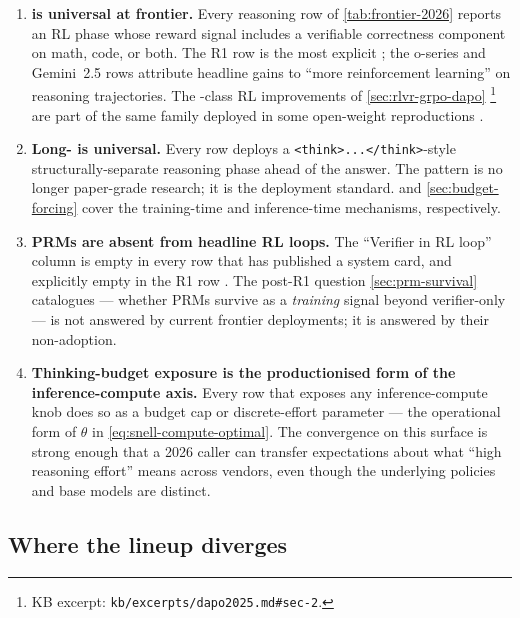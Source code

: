 \begin{enumerate}
\item \textbf{ is universal at frontier.} Every reasoning row of
\cref{tab:frontier-2026} reports an RL phase whose reward signal
includes a verifiable correctness component on math, code, or both.
The R1 row is the most explicit \citep[\S 2.2]{deepseek-r1}; the
o-series and Gemini~2.5 rows attribute headline gains to ``more
reinforcement learning''  on
reasoning trajectories. The -class RL improvements
of \cref{sec:rlvr-grpo-dapo} \citep{dapo2025}\footnote{KB excerpt:
\texttt{kb/excerpts/dapo2025.md\#sec-2}.} are part of the same family
deployed in some open-weight reproductions \citep{tulu3}.

\item \textbf{Long- is universal.} Every row deploys a
\texttt{<think>...</think>}-style structurally-separate reasoning
phase ahead of the answer. The pattern is no longer paper-grade
research; it is the deployment standard.  and
\cref{sec:budget-forcing} cover the training-time and inference-time
mechanisms, respectively.

\item \textbf{PRMs are absent from headline RL loops.} The
``Verifier in RL loop'' column is empty in every row that has
published a system card, and explicitly empty in the R1 row
\citep[\S 2.2]{deepseek-r1}. The post-R1 question
\cref{sec:prm-survival} catalogues --- whether PRMs survive as a
\emph{training} signal beyond verifier-only  --- is not answered
by current frontier deployments; it is answered by their non-adoption.

\item \textbf{Thinking-budget exposure is the productionised form of
the inference-compute axis.} Every row that exposes any
inference-compute knob does so as a budget cap or discrete-effort
parameter --- the operational form of $\theta$ in
\cref{eq:snell-compute-optimal}. The convergence on this surface is
strong enough that a 2026 caller can transfer expectations about
what ``high reasoning effort'' means across vendors, even though the
underlying policies and base models are distinct.
\end{enumerate}

\subsection{Where the lineup diverges}
\label{sec:frontier-diverge}

